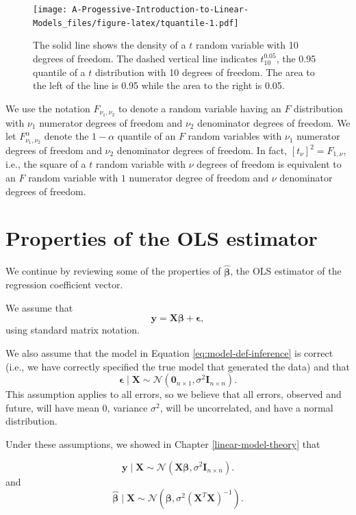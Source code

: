 \documentclass[
]{book}
\theoremstyle{definition}
\theoremstyle{definition}
\theoremstyle{definition}
\theoremstyle{definition}
\theoremstyle{remark}
\begin{document}
\begin{figure}
\centering
\texttt{[image: A-Progessive-Introduction-to-Linear-Models\_files/figure-latex/tquantile-1.pdf]}
\caption{\label{fig:tquantile}The solid line shows the density of a \(t\) random variable with 10 degrees of freedom. The dashed vertical line indicates \(t^{0.05}_{10}\), the 0.95 quantile of a \(t\) distribution with 10 degrees of freedom. The area to the left of the line is 0.95 while the area to the right is 0.05.}
\end{figure}

We use the notation \(F_{\nu_1, \nu_2}\) to denote a random variable
having an \(F\) distribution with \(\nu_1\) numerator degrees of freedom and
\(\nu_2\) denominator degrees of freedom. We let
\(F^{\alpha}_{\nu_1,\nu_2}\) denote the \(1-\alpha\) quantile of an \(F\)
random variables with \(\nu_1\) numerator degrees of freedom and \(\nu_2\)
denominator degrees of freedom. In fact, \([t_{\nu}]^2=F_{1,\nu}\), i.e.,
the square of a \(t\) random variable with \(\nu\) degrees of freedom is
equivalent to an \(F\) random variable with \(1\) numerator degree of
freedom and \(\nu\) denominator degrees of freedom.

\hypertarget{properties-betahat}{%
\section{Properties of the OLS estimator}\label{properties-betahat}}

We continue by reviewing some of the properties of
\(\hat{\boldsymbol{\beta}}\), the OLS estimator of the regression
coefficient vector.

We assume that
\[
\mathbf{y} = \mathbf{X}\boldsymbol{\beta}+\boldsymbol{\epsilon}, \label{eq:model-def-inference}
\] using standard matrix notation.

We also assume that the model in Equation \eqref{eq:model-def-inference}
is correct (i.e., we have correctly specified the true model that
generated the data) and that
\[
\boldsymbol{\epsilon}\mid \mathbf{X}\sim \mathcal{N}(\mathbf{0}_{n\times 1},\sigma^2 \mathbf{I}_{n\times n}).  \label{eq:error-assumption-inference}
\]
This assumption applies to all errors, so we believe that all errors, observed and future, will have mean 0, variance \(\sigma^2\), will be uncorrelated, and have a normal distribution.

Under these assumptions, we showed in Chapter \ref{linear-model-theory}
that

\[
\mathbf{y}\mid \mathbf{X}\sim \mathcal{N}(\mathbf{X}\boldsymbol{\beta}, \sigma^2 \mathbf{I}_{n\times n}).
\]
and
\[\hat{\boldsymbol{\beta}}\mid \mathbf{X} \sim \mathcal{N}(\boldsymbol{\beta}, \sigma^2(\mathbf{X}^T\mathbf{X})^{-1}).
\label{eq:prop-betahat}
\]
\end{document}
